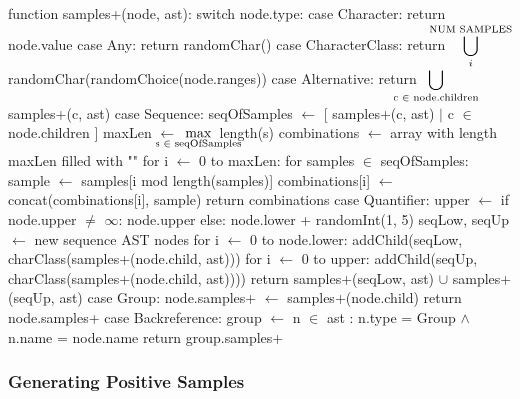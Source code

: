 \begin{pseudoCode}[float=htb,title={Generating Positive Test Samples},label=code:verificationPositive]
function samples+(node, ast):
  switch node.type:
    case Character: %
      return { node.value }
    case Any:
      return { randomChar() } %
    case CharacterClass: %
      return ${\displaystyle \hspace{-1.5em}\bigcup_{i}^\text{NUM SAMPLES}}\hspace{-1.5em}$ randomChar(randomChoice(node.ranges)) %
    case Alternative: %
      return ${\displaystyle \hspace{-2em}\bigcup_{\text{c }\in\text{ node.children}}\hspace{-2em}}$ samples+(c, ast) %
    case Sequence:  %
      seqOfSamples $\gets$ [ samples+(c, ast) $\mid$ c $\in$ node.children ]
      maxLen $\gets$ ${\displaystyle \hspace{-2em}\max_{\text{s } \in \text{ seqOfSamples}}}\hspace{-2em}$  length(s)
      combinations $\gets$ array with length maxLen filled with ""
      for i $\gets$ 0 to maxLen:
        for samples $\in$ seqOfSamples:
          sample $\gets$ samples[i mod length(samples)]
          combinations[i] $\gets$ concat(combinations[i], sample)
      return combinations %
    case Quantifier: %
      upper $\gets$ if node.upper $\neq$ $\infty$:
                 node.upper 
               else: node.lower + randomInt(1, 5) 
      seqLow, seqUp $\gets$ new sequence AST nodes %
      for i $\gets$ 0 to node.lower:
        addChild(seqLow, charClass(samples+(node.child, ast)))
      for i $\gets$ 0 to upper:
        addChild(seqUp, charClass(samples+(node.child, ast))))
      return samples+(seqLow, ast) $\cup$ samples+(seqUp, ast) %
    case Group: %
        node.samples+ $\gets$ samples+(node.child)        
        return node.samples+
    case Backreference:
      group $\gets$ n $\in$ ast : n.type = Group $\land$ n.name = node.name
      return group.samples+ %
\end{pseudoCode}

\subsubsection{Generating Positive Samples}


